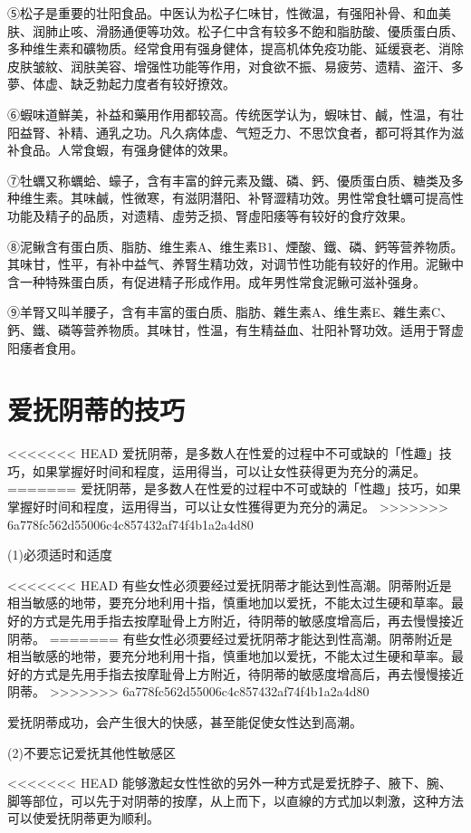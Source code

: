\documentclass[12pt,UTF8]{ctexbook}
\begin{document}
⑤松子是重要的壮阳食品。中医认为松子仁味甘，性微温，有强阳补骨、和血美肤、润肺止咳、滑肠通便等功效。松子仁中含有较多不飽和脂肪酸、優质蛋白质、多种维生素和礦物质。经常食用有强身健体，提高机体免疫功能、延缓衰老、消除皮肤皱紋、润肤美容、增强性功能等作用，对食欲不振、易疲劳、遗精、盗汗、多夢、体虚、缺乏勃起力度者有较好撩效。

⑥蝦味道鮮美，补益和藥用作用都较高。传统医学认为，蝦味甘、鹹，性温，有壮阳益腎、补精、通乳之功。凡久病体虚、气短乏力、不思饮食者，都可将其作为滋补食品。人常食蝦，有强身健体的效果。

⑦牡蠣又称蠣蛤、蠔子，含有丰富的鋅元素及鐵、磷、鈣、優质蛋白质、糖类及多种维生素。其味鹹，性微寒，有滋阴潛阳、补腎澀精功效。男性常食牡蠣可提高性功能及精子的品质，对遗精、虛劳乏损、腎虛阳痿等有较好的食疗效果。

⑧泥鳅含有蛋白质、脂肪、维生素A、维生素B1、煙酸、鐵、磷、鈣等营养物质。其味甘，性平，有补中益气、养腎生精功效，对调节性功能有较好的作用。泥鳅中含一种特殊蛋白质，有促进精子形成作用。成年男性常食泥鳅可滋补强身。

⑨羊腎又叫羊腰子，含有丰富的蛋白质、脂肪、雜生素A、维生素E、雜生素C、鈣、鐵、磷等营养物质。其味甘，性温，有生精益血、壮阳补腎功效。适用于腎虚阳痿者食用。

\section{爱抚阴蒂的技巧}

<<<<<<< HEAD
爱抚阴蒂，是多数人在性爱的过程中不可或缺的「性趣」技巧，如果掌握好时间和程度，运用得当，可以让女性获得更为充分的满足。
=======
爱抚阴蒂，是多数人在性爱的过程中不可或缺的「性趣」技巧，如果掌握好时间和程度，运用得当，可以让女性獲得更为充分的满足。
>>>>>>> 6a778fc562d55006c4c857432af74f4b1a2a4d80

(1)必须适时和适度

<<<<<<< HEAD
有些女性必须要经过爱抚阴蒂才能达到性高潮。阴蒂附近是相当敏感的地带，要充分地利用十指，慎重地加以爱抚，不能太过生硬和草率。最好的方式是先用手指去按摩耻骨上方附近，待阴蒂的敏感度增高后，再去慢慢接近阴蒂。
=======
有些女性必须要经过爱抚阴蒂才能达到性高潮。阴蒂附近是相当敏感的地带，要充分地利用十指，慎重地加以爱抚，不能太过生硬和草率。最好的方式是先用手指去按摩耻骨上方附近，待阴蒂的敏感度增高后，再去慢慢接近阴蒂。
>>>>>>> 6a778fc562d55006c4c857432af74f4b1a2a4d80

爱抚阴蒂成功，会产生很大的快感，甚至能促使女性达到高潮。

(2)不要忘记爱抚其他性敏感区

<<<<<<< HEAD
能够激起女性性欲的另外一种方式是爱抚脖子、腋下、腕、脚等部位，可以先于对阴蒂的按摩，从上而下，以直線的方式加以刺激，这种方法可以使爱抚阴蒂更为顺利。
\end{document}
